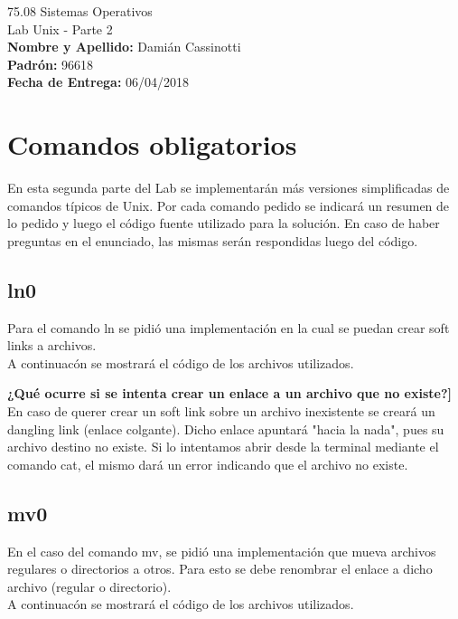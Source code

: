 \documentclass[a4paper, 12pt]{article}
\begin{document}
		
	\begin{titlepage}
		\vspace*{\fill}
		\begin{center}
			\Large 75.08 Sistemas Operativos \\
			\Huge Lab Unix - Parte 2 \\
			\bigskip\bigskip\bigskip
			\large\textbf{Nombre y Apellido:} Damián Cassinotti \\
			\textbf{Padrón:} 96618 \\
			\textbf{Fecha de Entrega:} 06/04/2018\\
					
		\end{center}
		\vspace*{\fill}
	\end{titlepage}
	\pagenumbering{arabic}
	\newpage
			
	\tableofcontents
	\newpage
	
	\section{Comandos obligatorios}
		En esta segunda parte del Lab se implementarán más versiones simplificadas de comandos típicos de Unix. Por cada comando pedido se indicará un resumen de lo pedido y luego el código fuente utilizado para la solución. En caso de haber preguntas en el enunciado, las mismas serán respondidas luego del código.
		\subsection{ln0}
		Para el comando ln se pidió una implementación en la cual se puedan crear soft links a archivos. \\
		A continuacón se mostrará el código de los archivos utilizados.
		
		\bigskip\bigskip\bigskip
		
		
		\textbf{¿Qué ocurre si se intenta crear un enlace a un archivo que no existe?]} En caso de querer crear un soft link sobre un archivo inexistente se creará un dangling link (enlace colgante). Dicho enlace apuntará "hacia la nada", pues su archivo destino no existe. Si lo intentamos abrir desde la terminal mediante el comando cat, el mismo dará un error indicando que el archivo no existe.  
		
		\subsection{mv0}
		En el caso del comando mv, se pidió una implementación que mueva archivos regulares o directorios a otros. Para esto se debe renombrar el enlace a dicho archivo (regular o directorio). \\
		A continuacón se mostrará el código de los archivos utilizados.
		
		\bigskip\bigskip\bigskip
		
		
\end{document}

